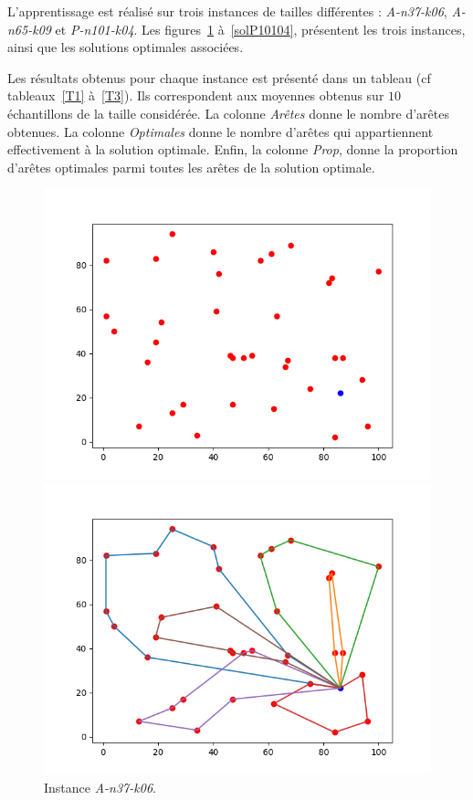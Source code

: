 \documentclass[a4paper,11pt]{article}%
\begin{document}
L'apprentissage est réalisé sur trois instances de tailles différentes : \emph{A-n37-k06}, \emph{A-n65-k09} et \emph{P-n101-k04}. Les figures~\ref{A3706} à~\ref{solP10104}, présentent les trois instances, ainsi que les solutions optimales associées. 

Les résultats obtenus pour chaque instance est présenté dans un tableau (cf tableaux~\ref{T1} à~\ref{T3}). Ils correspondent aux moyennes obtenus sur $10$ échantillons de la taille considérée.
La colonne \emph{Arêtes} donne le nombre d'arêtes obtenues. 
La colonne  \emph{Optimales} donne le nombre d'arêtes qui appartiennent effectivement à la solution optimale.
Enfin, la colonne \emph{Prop}, donne la proportion d'arêtes optimales parmi toutes les arêtes de la solution optimale. 

\begin{figure}[h!]
    \begin{minipage}[c]{.46\linewidth}

        \centering
        \includegraphics[scale=0.4]{instance3706}
        
        \caption{Instance \emph{A-n37-k06}.}
        \label{A3706}

    \end{minipage}
    \hfill%
    \begin{minipage}[c]{.46\linewidth}
        \centering
        \includegraphics[scale=0.4]{best3706}
        

\end{minipage}
\end{figure}
\end{document}
